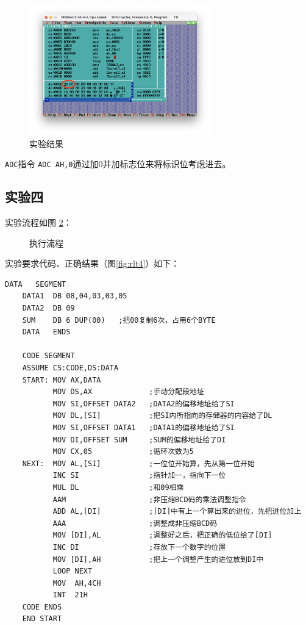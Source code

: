 \documentclass[11pt]{SEU-Digital-Report}
\begin{document}
\begin{figure}[htbp]
    \centering
    \includegraphics[width=0.7\textwidth]{fig/rlt3.png}
    \caption{实验结果}
    \label{fig:rlt3}
\end{figure}

\begin{note}{\texttt{ADC}指令}{}
    \texttt{ADC AH,0}通过加0并加标志位来将标识位考虑进去。
\end{note}

\subsection{实验四}
实验流程如图 \ref{fig:exp34}：
\begin{figure}[hbpt]
    \centering
    
    \caption{执行流程}
    \label{fig:exp34}
\end{figure}

实验要求代码、正确结果（图\ref{fig:rlt4}）如下：
\begin{lstlisting}[language={[x86masm]Assembler},title=exp34.asm]
    DATA   SEGMENT
    DATA1  DB 08,04,03,03,05
    DATA2  DB 09
    SUM    DB 6 DUP(00)   ;把00复制6次，占用6个BYTE
    DATA   ENDS 
      
    CODE SEGMENT
    ASSUME CS:CODE,DS:DATA
    START: MOV AX,DATA          
           MOV DS,AX             ;手动分配段地址
           MOV SI,OFFSET DATA2   ;DATA2的偏移地址给了SI
           MOV DL,[SI]           ;把SI内所指向的存储器的内容给了DL
           MOV SI,OFFSET DATA1   ;DATA1的偏移地址给了SI
           MOV DI,OFFSET SUM     ;SUM的偏移地址给了DI
           MOV CX,05             ;循环次数为5
    NEXT:  MOV AL,[SI]           ;一位位开始算，先从第一位开始
           INC SI                ;指针加一，指向下一位
           MUL DL                ;和09相乘
           AAM                   ;非压缩BCD码的乘法调整指令
           ADD AL,[DI]           ;[DI]中有上一个算出来的进位，先把进位加上
           AAA                   ;调整成非压缩BCD码
           MOV [DI],AL           ;调整好之后，把正确的低位给了[DI]
           INC DI                ;存放下一个数字的位置
           MOV [DI],AH           ;把上一个调整产生的进位放到DI中
           LOOP NEXT
           MOV  AH,4CH
           INT  21H
    CODE ENDS
    END START     
\end{lstlisting}
\end{document}
